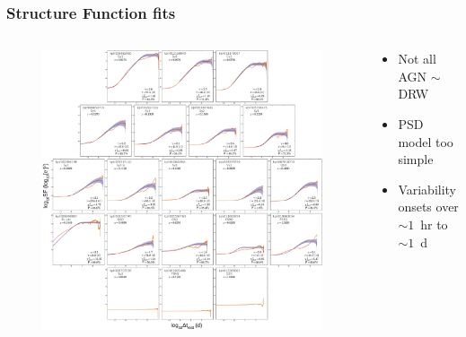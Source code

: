 \documentclass[hyperref={pdfpagelabels=false}]{beamer}
\begin{document}
\begin{frame}
\frametitle{Structure Function fits} 
  \begin{columns}
    \centering
    \begin{column}{0.65\textwidth}
      \begin{figure}
        \includegraphics[scale=0.45]{images/AllSF.jpg}
      \end{figure}
    \end{column}
    \begin{column}{0.35\textwidth}
        \begin{itemize}
        \item Not all AGN $\sim$ DRW
        \item PSD model too simple
        \item Variability onsets over $\sim 1$~hr to $\sim 1$~d
        \end{itemize}
          {\tiny \citet*{Kasliwal15}}
    \end{column}
  \end{columns}
\end{frame}
\end{document}

